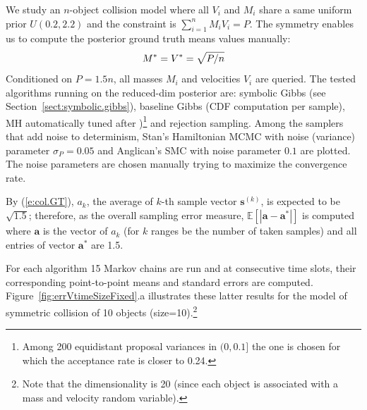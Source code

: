 \documentclass{article}
\newcommand{\bvec}[1]{\textbf{#1}}
\begin{document}
{We study an $n$-object collision model where 
all $V_i$ and $M_i$ share a same uniform prior $U(0.2, 2.2)$ and the constraint is $\sum_{i=1}^n{M_i V_i} = P$. 
The symmetry enables us to compute the posterior ground truth means  values  manually:
\begin{equation}\footnotesize
\label{e:col.GT}
M^* = V^* = \sqrt{P / n} %
\end{equation}
Conditioned on $P = 1.5 n$, all masses $M_i$ and velocities  $V_i$ are queried. 
The tested algorithms running on the reduced-dim posterior are: 
symbolic Gibbs (see Section~\ref{sect:symbolic.gibbs}), 
baseline Gibbs (CDF computation per sample), 
MH automatically tuned %
after \cite{roberts1997weak})\footnote{
\label{foot:tuning}
Among 200 {\color{green} equidistant} proposal variances in %
$(0, 0.1]$ %
the one is chosen for which the acceptance rate is closer to 0.24.
} and rejection sampling.
Among the samplers that add noise to determinism, %
Stan's Hamiltonian MCMC with noise (variance) parameter 
$\sigma_P = 0.05$ and Anglican's SMC with noise parameter $0.1$ are plotted.
The noise parameters are chosen manually trying to maximize the convergence rate.

By (\ref{e:col.GT}), $a_k$, the average  of $k$-th sample vector $\bvec{s}^{(k)}$,
is expected to be $\sqrt{1.5}$;   
therefore, as the overall sampling error measure, 
$\mathbb{E}[|\bvec{a} - \bvec{a}^*|]$ is computed where
$\bvec{a}$ is the vector of $a_k$ (for $k$ ranges be the number of taken samples) and all entries of vector $\bvec{a}^*$ are 1.5.

For each algorithm 15 Markov chains are run and 
at consecutive time slots, their corresponding point-to-point means and standard errors are computed. 
Figure~\ref{fig:errVtimeSizeFixed}.a 
illustrates these latter results for the model of symmetric collision of 10 objects (size=10).\footnote{
Note that the dimensionality is 20 (since each object is associated with a mass and velocity random variable). %
} 

}
\end{document}
